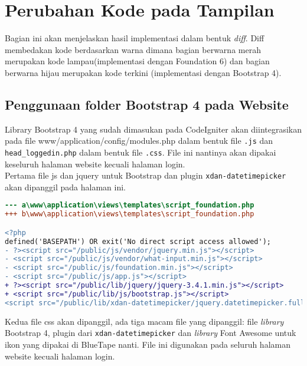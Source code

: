 \section{Perubahan Kode pada Tampilan}

Bagian ini akan menjelaskan hasil implementasi dalam bentuk \textit{diff}. Diff membedakan kode berdasarkan warna dimana bagian berwarna merah merupakan kode lampau(implementasi dengan Foundation 6) dan bagian berwarna hijau merupakan kode terkini  (implementasi dengan Bootstrap 4).
   
\subsection{Penggunaan folder Bootstrap 4 pada Website}

Library Bootstrap 4 yang sudah dimasukan pada CodeIgniter akan diintegrasikan pada file www/application/config/modules.php dalam bentuk file \texttt{.js} dan \texttt{head\_loggedin.php} dalam bentuk file \texttt{.css}. File ini nantinya akan dipakai keseluruh halaman website kecuali halaman login.\\

Pertama file js dan jquery untuk Bootstrap dan plugin \texttt{xdan-datetimepicker} akan dipanggil pada halaman ini. \\

\begin{lstlisting}[language=diff, caption=Penambahan \path{\views\templates\script_foundation.php}, label=Entri, basicstyle=\ttfamily, frame=single,
columns=fullflexible, keepspaces=true, breaklines=true]
--- a\www\application\views\templates\script_foundation.php		
+++ b\www\application\views\templates\script_foundation.php	

<?php
defined('BASEPATH') OR exit('No direct script access allowed');
- ?><script src="/public/js/vendor/jquery.min.js"></script>
- <script src="/public/js/vendor/what-input.min.js"></script>
- <script src="/public/js/foundation.min.js"></script>
- <script src="/public/js/app.js"></script>
+ ?><script src="/public/lib/jquery/jquery-3.4.1.min.js"></script>
+ <script src="/public/lib/js/bootstrap.js"></script>
<script src="/public/lib/xdan-datetimepicker/jquery.datetimepicker.full.min.js"></script>
\end{lstlisting}

Kedua file css akan dipanggil, ada tiga macam file yang dipanggil: file  \textit{library} Bootstrap 4, plugin dari \texttt{xdan-datetimepicker} dan \textit{library} Font Awesome untuk ikon yang dipakai di BlueTape nanti. File ini digunakan pada seluruh halaman website kecuali halaman login.
 
